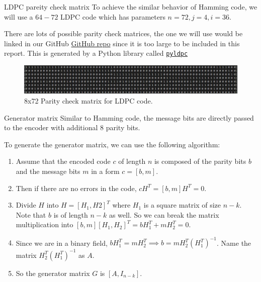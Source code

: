 \documentclass{beamer}
\begin{document}
\begin{frame}{LDPC pareity check matrix}
    To achieve the similar behavior of Hamming code, we will use a $64-72$ LDPC code which has parameters $n=72, j=4, i=36$.

    There are lots of possible parity check matrices, the one we will use would be linked in our GitHub \href{https://hichamjanati.github.io/pyldpc/}{GitHub repo} since it is too large to be included in this report. This is generated by a Python library called \href{https://hichamjanati.github.io/pyldpc/}{\texttt{pyldpc}}

    \begin{figure}[htbp]
      \centerline{\includegraphics[scale = 0.4]{Images/LDPC_Parity_Matrix.jpg}}
      \caption{8x72 Parity check matrix for LDPC code.}
  \end{figure}
    
\end{frame}

\begin{frame}{Generator matrix}
    Similar to Hamming code, the message bits are directly passed to the encoder with additional 8 parity bits.

    To generate the generator matrix, we can use the following algorithm:
    \begin{enumerate}
      \item Assume that the encoded code $c$ of length $n$ is composed of the parity bits
            $b$ and the message bits $m$ in a form $c = [b, m]$.
      \item Then if there are no errors in the code, $cH^T = [b, m]H^T = 0$.
      \item Divide $H$ into $H = [H_1, H2]^T$ where $H_1$ is a square matrix of size $n-k$.
            Note that $b$ is of length $n-k$ as well. So we can break the matrix
            multiplication into $[b, m][H_1, H_2]^T = bH_1^T + mH_2^T = 0$.
      \item Since we are in a binary field, $bH_1^T = mH_2^T \implies b =
              mH_2^T(H_1^T)^{-1}$. Name the matrix $H_2^T(H_1^T)^{-1}$ as $A$.
      \item So the generator matrix $G$ is $[A, I_{n-k}]$.
    \end{enumerate}
\end{frame}
\end{document}
